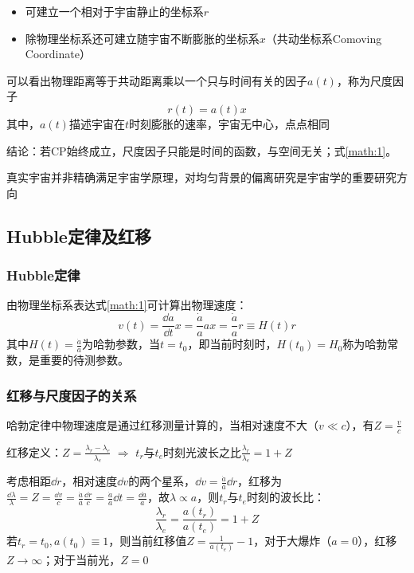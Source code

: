 \begin{itemize}
	\item 可建立一个相对于宇宙静止的坐标系$r$
	\item 除物理坐标系还可建立随宇宙不断膨胀的坐标系$x$（共动坐标系Comoving Coordinate）
\end{itemize}
\par 
可以看出物理距离等于共动距离乘以一个只与时间有关的因子$a(t)$，称为尺度因子
\begin{equation}
	r(t) = a(t) x
	\label{math:1}
\end{equation}
其中，$a(t)$描述宇宙在$t$时刻膨胀的速率，宇宙无中心，点点相同
\par 
结论：若CP始终成立，尺度因子只能是时间的函数，与空间无关；式\eqref{math:1}。
\begin{cnote}
	真实宇宙并非精确满足宇宙学原理，对均匀背景的偏离研究是宇宙学的重要研究方向
\end{cnote}

\subsection{Hubble定律及红移}
\subsubsection{Hubble定律}
\par 
由物理坐标系表达式\eqref{math:1}可计算出物理速度：
\begin{equation}
	v(t) = \frac{\dd a}{\dd t} x = \frac{\dot{a}}{a} a x = \frac{\dot{a}}{a} r \equiv H(t) r
\end{equation}
其中$H(t) = \frac{\dot{a}}{a}$为哈勃参数，当$t = t_0$，即当前时刻时，$H(t_0) = H_0$称为哈勃常数，是重要的待测参数。

\subsubsection{红移与尺度因子的关系}
\par 
哈勃定律中物理速度是通过红移测量计算的，当相对速度不大（$v \ll c$），有$Z = \frac{v}{c}$
\par 
红移定义：$Z = \frac{\lambda_r - \lambda_e}{\lambda_e}$ $\Rightarrow$ $t_r$与$t_e$时刻光波长之比$\frac{\lambda_r}{\lambda_e} = 1 + Z$
\par 
考虑相距$\dd r$，相对速度$\dd v$的两个星系，$\dd v = \frac{\dot{a}}{a} \dd r$，红移为$\frac{\dd \lambda}{\lambda} = Z = \frac{\dd v}{c} = \frac{\dot{a}}{a} \frac{\dd r}{c} = \frac{\dot{a}}{a} \dd t = \frac{\dd a}{a}$，故$\lambda \propto a$，则$t_r$与$t_e$时刻的波长比：
\begin{equation}
	\frac{\lambda_r}{\lambda_e} = \frac{a(t_r)}{a(t_e)} = 1 + Z
	\label{math:2}
\end{equation}
若$t_r = t_0, a(t_0) \equiv 1$，则当前红移值$Z = \frac{1}{a(t_e)} - 1$，对于大爆炸（$a = 0$），红移$Z \rightarrow \infty$；对于当前光，$Z = 0$

